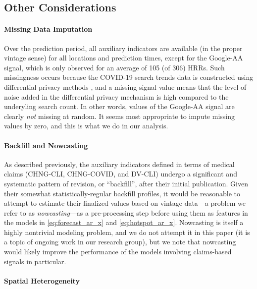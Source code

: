 \documentclass[9pt,twocolumn,twoside,lineno]{pnas-new}
\begin{document}
\subsection{Other Considerations}

\paragraph{Missing Data Imputation}

Over the prediction period, all auxiliary indicators are available (in the
proper vintage sense) for all locations and prediction times, except for the
Google-AA signal, which is only observed for an average of 105 (of 306) HRRs.
Such missingness occurs because the COVID-19 search trends data is
constructed using differential privacy methods \cite{Bavadekar:2020}, and a 
missing signal value means that the level of noise added in the differential
privacy mechanism is high compared to the underyling search count.  In other
words, values of the Google-AA signal are clearly \textit{not} missing at
random.  It seems most appropriate to impute missing values by zero, and this is
what we do in our analysis. 

\paragraph{Backfill and Nowcasting}  

As described previously, the auxiliary indicators defined in terms of medical
claims (CHNG-CLI, CHNG-COVID, and DV-CLI) undergo a significant and systematic
pattern of revision, or ``backfill'', after their initial publication.  Given
their somewhat statistically-regular backfill profiles, it would be reasonable
to attempt to estimate their finalized values based on vintage data---a problem
we refer to as \textit{nowcasting}---as a pre-processing step before using them
as features in the models in \eqref{eq:forecast_ar_x} and \eqref{eq:hotspot_ar_x}. 
Nowcasting is itself a highly nontrivial modeling problem, and we do not attempt
it in this paper (it is a topic of ongoing work in our research group), but we
note that nowcasting would likely improve the performance of the models
involving claims-based signals in particular.        

\paragraph{Spatial Heterogeneity} 
\end{document}
